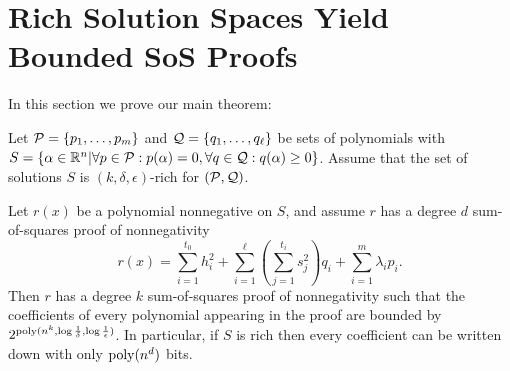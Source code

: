 \section{Rich Solution Spaces Yield Bounded SoS Proofs}
\label{sec:main}

In this section we prove our main theorem:

\begin{theorem}\label{thm:main}
Let $\mathcal P = \{p_1,\dots,p_m\}$ and $\mathcal Q = \{q_1, \dots, q_\ell\}$ be sets of polynomials with $S = \{\alpha \in \mathbb R^n | \forall p \in \mathcal P: p(\alpha) = 0, \forall q \in \mathcal Q: q(\alpha) \geq 0\}$. Assume that the set of solutions $S$ is $(k,\delta,\epsilon)$-rich for $(\mathcal P,\mathcal Q)$.

Let $r(x)$ be a polynomial nonnegative on $S$, and assume $r$ has a degree $d$ sum-of-squares proof of nonnegativity 
\[r(x) = \sum_{i=1}^{t_0} h_i^2 + \sum_{i=1}^\ell \left(\sum_{j=1}^{t_i} s_j^2\right) q_i + \sum_{i=1}^m \lambda_i p_i.\] 
Then $r$ has a degree $k$ sum-of-squares proof of nonnegativity such that the coefficients of every polynomial appearing in the proof are bounded by $2^{\operatorname{poly}(n^k,\log \frac{1}{\delta},\log \frac{1}{\epsilon})}$. In particular, if $S$ is rich then every coefficient can be written down with only $\operatorname{poly}(n^d)$ bits. 
\end{theorem}
